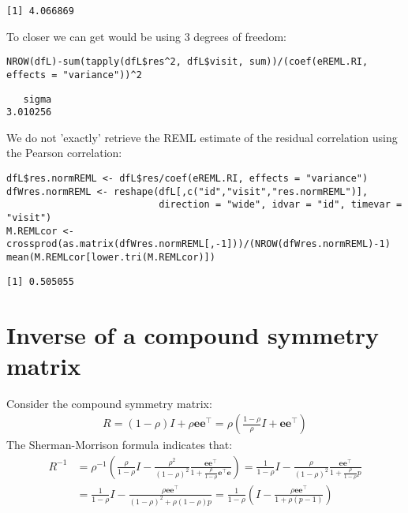 \documentclass[12pt]{article}
\newcommand\Ve{\mathbf{e}}
\newcommand\trans[1]{{#1}^\intercal}%
\begin{document}
\begin{verbatim}
[1] 4.066869
\end{verbatim}


To closer we can get would be using 3 degrees of freedom:
\lstset{language=r,label= ,caption= ,captionpos=b,numbers=none}
\begin{lstlisting}
NROW(dfL)-sum(tapply(dfL$res^2, dfL$visit, sum))/(coef(eREML.RI, effects = "variance"))^2
\end{lstlisting}

\begin{verbatim}
   sigma 
3.010256
\end{verbatim}



We do not 'exactly' retrieve the REML estimate of the residual
correlation using the Pearson correlation:
\lstset{language=r,label= ,caption= ,captionpos=b,numbers=none}
\begin{lstlisting}
dfL$res.normREML <- dfL$res/coef(eREML.RI, effects = "variance")
dfWres.normREML <- reshape(dfL[,c("id","visit","res.normREML")],
                           direction = "wide", idvar = "id", timevar = "visit")
M.REMLcor <- crossprod(as.matrix(dfWres.normREML[,-1]))/(NROW(dfWres.normREML)-1)
mean(M.REMLcor[lower.tri(M.REMLcor)])
\end{lstlisting}

\begin{verbatim}
[1] 0.505055
\end{verbatim}


\clearpage

\appendix

\section{Inverse of a compound symmetry matrix}
\label{sm:invCS}
Consider the compound symmetry matrix:
\begin{align*}
R= (1-\rho) I + \rho \Ve\trans{\Ve}= \rho\left(\frac{1-\rho}{\rho} I + \Ve\trans{\Ve}\right) 
\end{align*}
The Sherman-Morrison formula indicates that:
\begin{align*}
R^{-1} &= \rho^{-1} \left(\frac{\rho}{1-\rho} I - \frac{\rho^2}{(1-\rho)^2}\frac{\Ve\trans{\Ve}}{1+\frac{\rho}{1-\rho}\trans{\Ve}\Ve}\right) = \frac{1}{1-\rho} I - \frac{\rho}{(1-\rho)^2}\frac{\Ve\trans{\Ve}}{1+\frac{\rho}{1-\rho}p} \\
&=  \frac{1}{1-\rho} I - \frac{\rho \Ve\trans{\Ve}}{(1-\rho)^2+\rho(1-\rho)p} =  \frac{1}{1-\rho} \left(I - \frac{\rho \Ve\trans{\Ve}}{1+\rho(p-1)}\right)
\end{align*}
\end{document}
